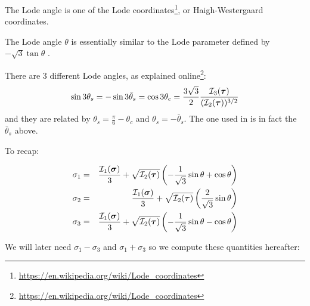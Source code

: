 \begin{remark} The Lode angle is one of the Lode 
coordinates\footnote{\url{https://en.wikipedia.org/wiki/Lode_coordinates}},
or Haigh-Westergaard coordinates. 
\end{remark}

\begin{remark} The Lode angle $\theta$ is essentially similar to the 
Lode parameter  defined by $-\sqrt{3}\tan\theta$ \cite{owhi}.
\end{remark}

\begin{remark}
There are 3 different Lode angles, as explained online\footnote{\url{https://en.wikipedia.org/wiki/Lode_coordinates}}:
\[
\sin 3\theta_s = -\sin 3 \bar{\theta}_s = \cos 3\theta_c = \frac{3\sqrt{3}}{2}\frac{{\cal I}_3({\bm \tau})}{({\cal I}_2({\bm \tau}))^{3/2}}
\]
and they are related by $\theta_s = \frac{\pi}{6}-\theta_c$ and $\theta_s = -\bar{\theta}_s$. 
The one used in \fieldstone is in fact the $\bar{\theta}_s$ above.
\label{rq:signs}
\end{remark}

To recap:
\begin{mdframed}[backgroundcolor=blue!5]
\begin{eqnarray}
\sigma_1 &=& \frac{{\cal I}_1({\bm \sigma})}{3} + \sqrt{{\cal I}_2({\bm \tau})} \left(-\frac{1}{\sqrt{3}}\sin \theta  +\cos\theta \right) \label{eq:sigma1} \\ 
\sigma_2 &=& \frac{{\cal I}_1({\bm \sigma})}{3} + \sqrt{{\cal I}_2({\bm \tau})} \left(\frac{2}{\sqrt{3}}\sin \theta   \right)    \label{eq:sigma2} \\
\sigma_3 &=& \frac{{\cal I}_1({\bm \sigma})}{3} + \sqrt{{\cal I}_2({\bm \tau})} \left(-\frac{1}{\sqrt{3}}\sin \theta  - \cos \theta \right)    \label{eq:sigma3}
\end{eqnarray}
\end{mdframed}


We will later need $\sigma_1-\sigma_3$ and $\sigma_1+\sigma_3$ so we compute these
quantities hereafter:

